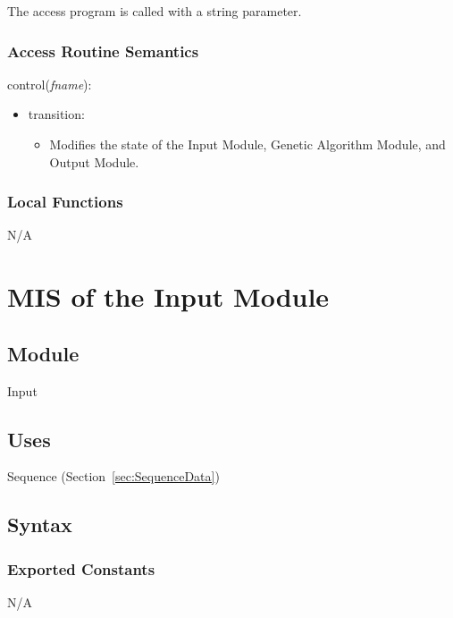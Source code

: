 \documentclass[12pt, titlepage]{article}
\begin{document}
The access program is called with a string parameter.

\subsubsection{Access Routine Semantics}

control(\textit{fname}):
\begin{itemize}
	\item transition: 
	\begin{itemize}
		\item[] Modifies the state of the Input Module, Genetic Algorithm 
		Module, and Output Module.
	\end{itemize}
\end{itemize}

\subsubsection{Local Functions}

N/A


\section{MIS of the Input Module} \label{sec:InputMod}

\subsection{Module}
Input

\subsection{Uses}
Sequence (Section~\ref{sec:SequenceData})

\subsection{Syntax}

\subsubsection{Exported Constants}
N/A
\end{document}

